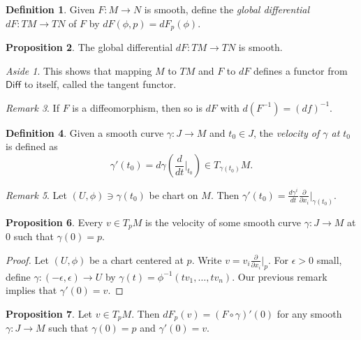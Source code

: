 \documentclass[10pt,letterpaper,cm]{nupset}
\theoremstyle{definition}
\newtheorem{definition}{Definition}[subsection]
\theoremstyle{theorem}
\newtheorem{prop}[definition]{Proposition}
\theoremstyle{remark}
\newtheorem{remark}[definition]{Remark}
\newtheorem*{aside}{Aside}
\newcommand{\1}{\mathbf{1}}
\newcommand{\0}{\vec 0}
\begin{document}
\begin{definition}
Given $F: M \to N$ is smooth, define the \textit{global differential} $dF: TM \to TN$ of $F$ by $dF(\phi, p) = dF_p(\phi)$.
\end{definition}

\begin{prop}
The global differential $dF: TM \to TN$ is smooth.
\end{prop}

\begin{aside}
This shows that mapping $M$ to $TM$ and $F$ to $dF$ defines a functor from $\mathsf{Diff}$ to itself, called the tangent functor.
\end{aside}

\begin{remark}
If $F$ is a diffeomorphism, then so is $dF$ with $d(F^{-1}) = (df)^{-1}$.
\end{remark}

\begin{definition}
Given a smooth curve $\gamma : J \to M$ and $t_0 \in J$, the \textit{velocity of $\gamma$ at $t_0$} is defined as $$\gamma'(t_0) = d\gamma \left(\frac{d}{dt}\rvert_{t_0} \right) \in T_{\gamma(t_0)}M.$$
\end{definition}

\begin{remark}
Let $(U, \phi) \ni \gamma(t_0)$ be chart on $M$. Then $\gamma'(t_0) = \frac{d\gamma^i}{dt} \frac{\partial}{\partial{x_i}}\rvert_{\gamma(t_0)}$.
\end{remark}

\begin{prop}
Every $v \in T_pM$ is the velocity of some smooth curve $\gamma : J \to M$ at $0$ such that $\gamma(0)=p$.
\end{prop}
\begin{proof}
Let $(U, \phi)$ be a chart centered at $p$. Write $v = v_i \frac{\partial}{\partial{x_i}}\rvert_{p}$. For $\epsilon >0$ small, define $\gamma: (-\epsilon , \epsilon) \to U$ by $\gamma(t) = \phi^{-1}(tv_1, \ldots, tv_n)$. Our previous remark implies that $\gamma'(0) = v$.
\end{proof}

\begin{prop}
Let $v \in T_pM$. Then $dF_p(v) = (F \circ \gamma)'(0)$ for any smooth $\gamma : J \to M$ such that $\gamma(0)=p$ and $\gamma'(0) =v$.
\end{prop}
\end{document}
